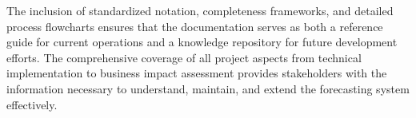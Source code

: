 		The inclusion of standardized notation, completeness frameworks, and detailed process flowcharts ensures that the documentation serves as both a reference guide for current operations and a knowledge repository for future development efforts. The comprehensive coverage of all project aspects from technical implementation to business impact assessment provides stakeholders with the information necessary to understand, maintain, and extend the forecasting system effectively.
